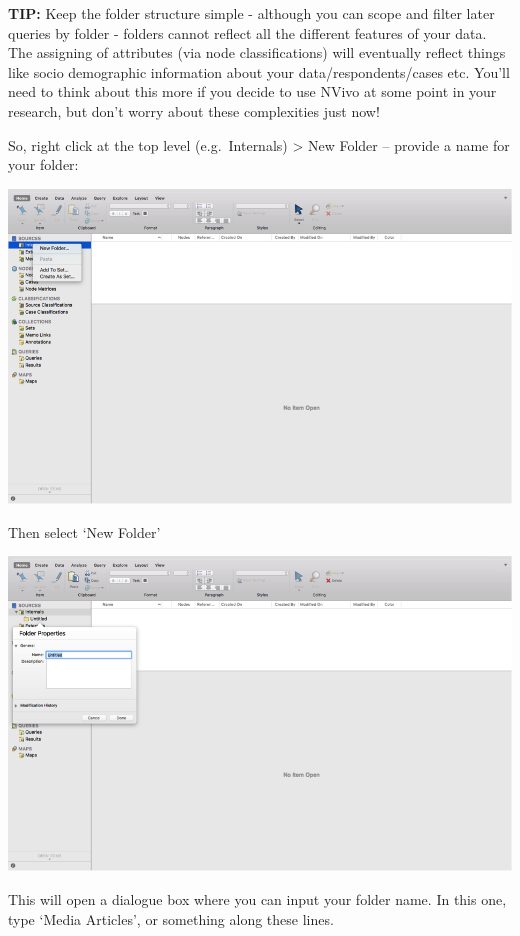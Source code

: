 \documentclass[]{book}
\theoremstyle{definition}
\theoremstyle{definition}
\theoremstyle{definition}
\theoremstyle{remark}
\begin{document}
\textbf{TIP:} Keep the folder structure simple - although you can scope
and filter later queries by folder - folders cannot reflect all the
different features of your data. The assigning of attributes (via node
classifications) will eventually reflect things like socio demographic
information about your data/respondents/cases etc. You'll need to think
about this more if you decide to use NVivo at some point in your
research, but don't worry about these complexities just now!

So, right click at the top level (e.g.~Internals) \textgreater{} New
Folder -- provide a name for your folder:

\includegraphics{imgs/qual_10.png}

Then select `New Folder'

\includegraphics{imgs/qual_11.png}

This will open a dialogue box where you can input your folder name. In
this one, type `Media Articles', or something along these lines.
\end{document}
